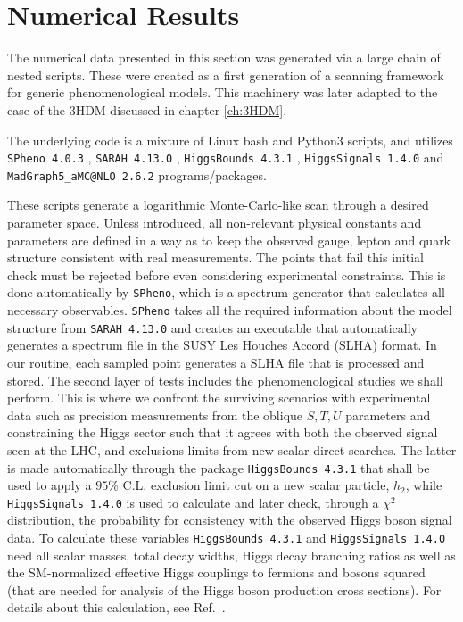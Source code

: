 \documentclass[10pt]{report}
\begin{document}
\section{Numerical Results}
\label{sec:parameter-space-studies}

The numerical data presented in this section was generated via a large chain of nested scripts. These were created as a first generation of a scanning framework for generic phenomenological models. This machinery was  later adapted to the case of the 3HDM discussed in chapter \ref{ch:3HDM}. 

The underlying code is a mixture of Linux bash and Python3 scripts, and utilizes \texttt{SPheno 4.0.3} \cite{Porod:2011nf},  \texttt{SARAH 4.13.0} \cite{Staub:2013tta}, \texttt{HiggsBounds 4.3.1} \cite{Bechtle:2013wla}, \texttt{HiggsSignals 1.4.0} \cite{Bechtle:2013xfa} and \texttt{MadGraph5\_aMC@NLO 2.6.2} \cite{Alwall:2014hca} programs/packages. 

These scripts generate a logarithmic Monte-Carlo-like scan through a desired parameter space. Unless introduced, all non-relevant physical constants and parameters are defined in a way as to keep the observed gauge, lepton and quark structure consistent with real measurements. 
%
The points that fail this initial check must be rejected before even considering experimental constraints. This is done automatically by \texttt{SPheno}, which is a spectrum generator that calculates all necessary observables. \texttt{SPheno} takes all the required information about the model structure from \texttt{SARAH 4.13.0} and creates an executable that automatically generates a spectrum file in the SUSY Les Houches Accord (SLHA) \cite{Skands:2003cj} format. In our routine, each sampled point generates a SLHA file that is processed and stored. 
%
The second layer of tests includes the phenomenological studies we shall perform. This is where we confront the surviving scenarios with experimental data such as precision measurements from the oblique $S,T,U$ parameters and constraining the Higgs sector such that it agrees with both the observed signal seen at the LHC, and exclusions limits from new scalar direct searches. The latter is made automatically through the package \texttt{HiggsBounds 4.3.1} that shall be used to apply a $95\%$ C.L. exclusion limit cut on a new scalar particle, $h_2$, while \texttt{HiggsSignals 1.4.0} is used to calculate and later check, through a $\chi^2$ distribution, the probability for consistency with the observed Higgs boson signal data. To calculate these variables \texttt{HiggsBounds 4.3.1} and \texttt{HiggsSignals 1.4.0} need all scalar masses, total decay widths, Higgs decay branching ratios as well as the SM-normalized effective Higgs couplings to fermions and bosons squared (that are needed for analysis of the Higgs boson production cross sections). For details about this calculation, see Ref.~\cite{Bechtle:2013wla}.
\end{document}
